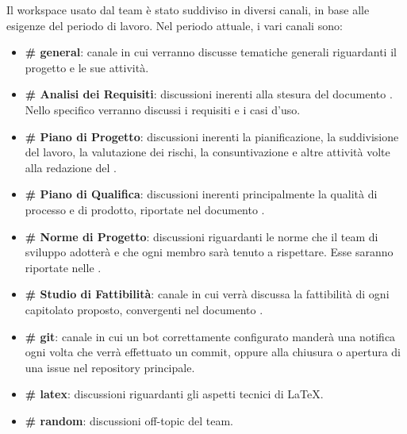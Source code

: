 			Il workspace usato dal team è stato suddiviso in diversi canali, in base alle esigenze del periodo di lavoro. Nel periodo attuale, i vari canali sono:
			\begin{itemize}
				\item \textbf{\# general}: canale in cui verranno discusse tematiche generali riguardanti il progetto e le sue attività.
				\item \textbf{\# Analisi dei Requisiti}: discussioni inerenti alla stesura del documento \Doc{\AdR}. Nello specifico verranno discussi
					 i requisiti e i casi d'uso.
				\item \textbf{\# Piano di Progetto}: discussioni inerenti la pianificazione, la suddivisione del lavoro, la valutazione dei rischi, la consuntivazione e
					altre attività volte alla redazione del \Doc{\PdP}.
				\item \textbf{\# Piano di Qualifica}: discussioni inerenti principalmente la qualità di processo e di prodotto, riportate nel documento \Doc{\PdQ}.
				\item \textbf{\# Norme di Progetto}: discussioni riguardanti le norme che il team di sviluppo adotterà e che ogni membro sarà tenuto a rispettare. Esse
					saranno riportate nelle \Doc{\NdP}.
				\item \textbf{\# Studio di Fattibilità}: canale in cui verrà discussa la fattibilità di ogni capitolato proposto, convergenti nel documento
					\Doc{\SdF}.
				\item \textbf{\# git}: canale in cui un bot correttamente configurato manderà una notifica ogni volta che verrà effettuato un commit, oppure alla chiusura o apertura di una issue nel repository principale.
				\item \textbf{\# latex}: discussioni riguardanti gli aspetti tecnici di \LaTeX.
				\item \textbf{\# random}: discussioni off-topic del team.
			\end{itemize}

